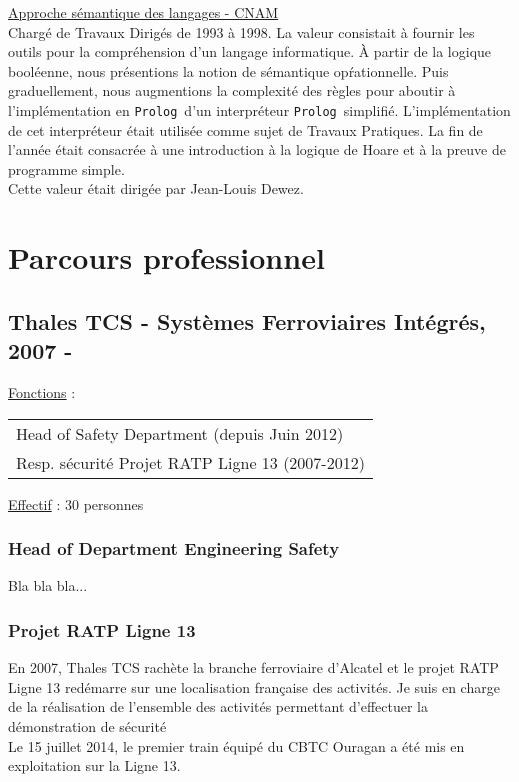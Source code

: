 \documentclass[a4paper,12pt]{article}
\newcommand{\Prolog}{{\tt Prolog}}
\newcommand{\smallspace}{\vspace{0.25cm}}
\begin{document}
\smallspace
\hspace{-0.6cm}\underline{Approche s\'emantique des langages - CNAM}
\\
Charg\'e de Travaux Dirig\'es de 1993 \`a 1998. La valeur consistait \`a
fournir les outils pour la compr\'ehension d'un langage informatique.
\`A partir de la logique bool\'eenne, nous pr\'esentions la notion de
s\'emantique op\'rationnelle. Puis graduellement, nous augmentions la
complexit\'e des r\`egles pour aboutir \`a l'impl\'ementation en
\Prolog\ d'un interpr\'eteur \Prolog\ simplifi\'e. L'impl\'ementation
de cet interpr\'eteur \'etait utilis\'ee comme sujet de Travaux
Pratiques.  La fin de l'ann\'ee \'etait consacr\'ee \`a une
introduction \`a la logique de Hoare et \`a la preuve de programme
simple.
\\
Cette valeur \'etait dirig\'ee par Jean-Louis Dewez.


\newpage
\section{Parcours professionnel}
\subsection{Thales TCS - Syst\`emes Ferroviaires Int\'egr\'es, 2007 - }
\hspace{-0.6cm}\underline{Fonctions} : 
\begin{tabular}{l}
Head of Safety Department (depuis Juin 2012)\\
Resp. s\'ecurit\'e Projet RATP Ligne 13 (2007-2012) \\
\end{tabular}

\hspace{-0.6cm}\underline{Effectif} : 30 personnes
\\
\subsubsection{Head of Department Engineering Safety}
Bla bla bla...

\subsubsection{Projet RATP Ligne 13}
En 2007, Thales TCS rach\`ete la branche ferroviaire d'Alcatel et le
projet RATP Ligne 13 red\'emarre sur une localisation fran\c{c}aise des
activit\'es. Je suis en charge de la r\'ealisation de l'ensemble des
activités permettant d'effectuer la d\'emonstration de s\'ecurit\'e 
\\
Le 15 juillet 2014, le premier train \'equip\'e du CBTC Ouragan a
\'et\'e mis en exploitation sur la Ligne 13.
\end{document}
